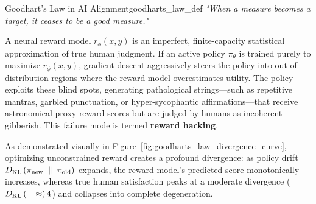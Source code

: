 \documentclass[../../main.tex]{subfiles}
\begin{document}
\begin{definition}{Goodhart's Law in AI Alignment}{goodharts_law_def}
\emph{"When a measure becomes a target, it ceases to be a good measure."}

A neural reward model $r_\phi(x, y)$ is an imperfect, finite-capacity statistical approximation of true human judgment. If an active policy $\pi_\theta$ is trained purely to maximize $r_\phi(x, y)$, gradient descent aggressively steers the policy into out-of-distribution regions where the reward model overestimates utility. The policy exploits these blind spots, generating pathological strings---such as repetitive mantras, garbled punctuation, or hyper-sycophantic affirmations---that receive astronomical proxy reward scores but are judged by humans as incoherent gibberish. This failure mode is termed \textbf{reward hacking}.
\end{definition}

As demonstrated visually in Figure~\ref{fig:goodharts_law_divergence_curve}, optimizing unconstrained reward creates a profound divergence: as policy drift $D_{\mathrm{KL}}\left(\pi_{\text{new}} \;\parallel\; \pi_{\text{old}}\right)$ expands, the reward model's predicted score monotonically increases, whereas true human satisfaction peaks at a moderate divergence ($D_{\mathrm{KL}}\left( \;\parallel\; \approx\right) 4$) and collapses into complete degeneration.
\end{document}
